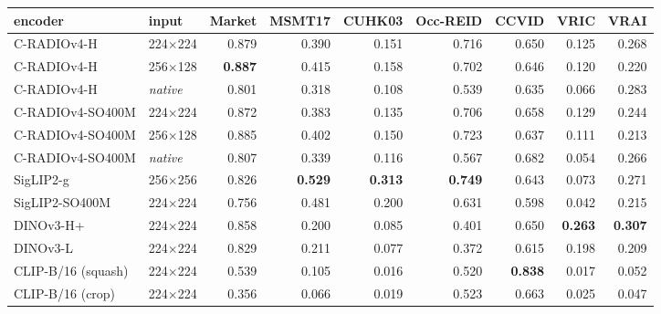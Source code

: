 \begin{tabular}{llrrrrrrr}
\toprule
encoder & input & Market & MSMT17 & CUHK03 & Occ-REID & CCVID & VRIC & VRAI \\
\midrule
C-RADIOv4-H & 224$\times$224 & 0.879 & 0.390 & 0.151 & 0.716 & 0.650 & 0.125 & 0.268 \\
C-RADIOv4-H & 256$\times$128 & \textbf{0.887} & 0.415 & 0.158 & 0.702 & 0.646 & 0.120 & 0.220 \\
C-RADIOv4-H & \textit{native} & 0.801 & 0.318 & 0.108 & 0.539 & 0.635 & 0.066 & 0.283 \\
C-RADIOv4-SO400M & 224$\times$224 & 0.872 & 0.383 & 0.135 & 0.706 & 0.658 & 0.129 & 0.244 \\
C-RADIOv4-SO400M & 256$\times$128 & 0.885 & 0.402 & 0.150 & 0.723 & 0.637 & 0.111 & 0.213 \\
C-RADIOv4-SO400M & \textit{native} & 0.807 & 0.339 & 0.116 & 0.567 & 0.682 & 0.054 & 0.266 \\
SigLIP2-g & 256$\times$256 & 0.826 & \textbf{0.529} & \textbf{0.313} & \textbf{0.749} & 0.643 & 0.073 & 0.271 \\
SigLIP2-SO400M & 224$\times$224 & 0.756 & 0.481 & 0.200 & 0.631 & 0.598 & 0.042 & 0.215 \\
DINOv3-H+ & 224$\times$224 & 0.858 & 0.200 & 0.085 & 0.401 & 0.650 & \textbf{0.263} & \textbf{0.307} \\
DINOv3-L & 224$\times$224 & 0.829 & 0.211 & 0.077 & 0.372 & 0.615 & 0.198 & 0.209 \\
CLIP-B/16 (squash) & 224$\times$224 & 0.539 & 0.105 & 0.016 & 0.520 & \textbf{0.838} & 0.017 & 0.052 \\
CLIP-B/16 (crop) & 224$\times$224 & 0.356 & 0.066 & 0.019 & 0.523 & 0.663 & 0.025 & 0.047 \\
\bottomrule
\end{tabular}
